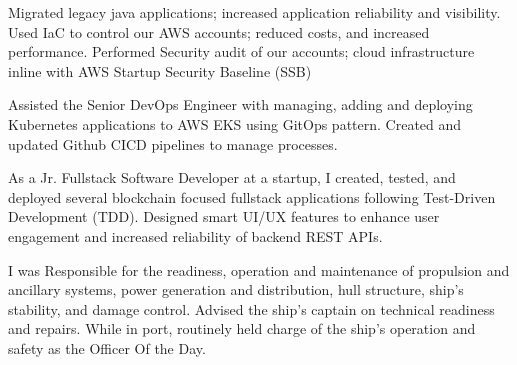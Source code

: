 \documentclass[10pt,a4paper,ragged2e,withhyper]{altacv}
\begin{document}
\begin{paracol}{2}
\begin{itemize}
Migrated legacy java applications; increased application reliability and
visibility. Used IaC to control our AWS accounts; reduced costs, and increased
performance. Performed Security audit of our accounts; cloud infrastructure
inline with AWS Startup Security Baseline (SSB)
\end{itemize}

\divider

\begin{itemize}
Assisted the Senior DevOps Engineer with managing, adding and deploying
Kubernetes applications to AWS EKS using GitOps pattern. Created and updated
Github CICD pipelines to manage processes.
\end{itemize}

\divider

\begin{itemize}
As a Jr. Fullstack Software Developer at a startup, I created, tested, and
deployed several blockchain focused fullstack applications following Test-Driven
Development (TDD). Designed smart UI/UX features to enhance user engagement and
increased reliability of backend REST APIs.
\end{itemize}


\divider

\begin{itemize}
I was Responsible for the readiness, operation and maintenance of propulsion
  and ancillary systems, power generation and distribution, hull structure,
  ship’s stability, and damage control. Advised the ship's captain on technical
  readiness and repairs. While in port, routinely held charge of the ship's
  operation and safety as the Officer Of the Day.
\end{itemize}


\end{paracol}
\end{document}
